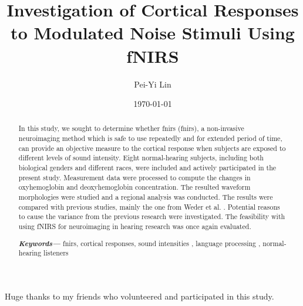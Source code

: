 \documentclass[a4paper, 12pt, twoside]{report}
\author{Pei-Yi Lin}
\title{Investigation of Cortical Responses to Modulated Noise Stimuli Using fNIRS}
\date{\today}
\numberwithin{equation}{section}
\providecommand{\keywords}[1]{\textbf{\textit{Keywords---}} #1}
\begin{document}
\maketitle{}


\begin{abstract}
In this study, we sought to determine whether \acrlong{fnirs} (\acrshort{fnirs}), a non-invasive neuroimaging method which is safe to use repeatedly and for extended period of time, can provide an objective measure to the cortical response when subjects are exposed to different levels of sound intensity. Eight normal-hearing subjects, including both biological genders and different races, were included and actively participated in the present study. Measurement data were processed to compute the changes in oxyhemoglobin and deoxyhemoglobin concentration. The resulted waveform morphologies were studied and a regional analysis was conducted. The results were compared with previous studies, mainly the one from Weder et al. \citeyearpar{Weder2018}. Potential reasons to cause the variance from the previous research \citep{Weder2018} were investigated. The feasibility with using fNIRS for neuroimaging in hearing research was once again evaluated. \\
\newline

\keywords{ \acrlong{fnirs},	cortical responses,	sound intensities , language processing ,	normal-hearing listeners}

\end{abstract}



\cleardoublepage{}


\begin{acknowledgments}
Huge thanks to my friends who volunteered and participated in this study.
\end{acknowledgments}


% 



\cleardoublepage{}
\tableofcontents
\cleardoublepage{}



%
\end{document}
